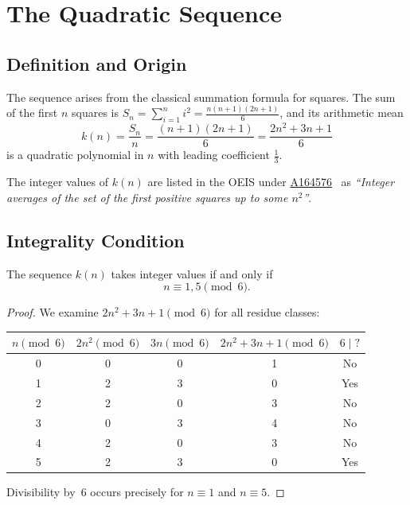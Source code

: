 \section{The Quadratic Sequence}\label{sec:sequence}

\subsection{Definition and Origin}

The sequence arises from the classical summation formula for squares.
The sum of the first $n$ squares is
$S_n = \sum_{i=1}^{n} i^2 = \frac{n(n+1)(2n+1)}{6}$,
and its arithmetic mean
\begin{equation}\label{eq:k-explicit}
  k(n) = \frac{S_n}{n} = \frac{(n+1)(2n+1)}{6}
       = \frac{2n^2 + 3n + 1}{6}
\end{equation}
is a quadratic polynomial in $n$ with leading coefficient $\frac{1}{3}$.

\begin{remark}
The integer values of $k(n)$ are listed in the OEIS under
\href{https://oeis.org/A164576}{A164576}~\cite{OEIS} as
\emph{``Integer averages of the set of the first positive squares up to
some $n^2$''}.
\end{remark}

\subsection{Integrality Condition}

\begin{theorem}\label{thm:congruence}
The sequence $k(n)$ takes integer values if and only if
\begin{equation}\label{eq:cong}
  n \equiv 1, 5 \pmod{6}.
\end{equation}
\end{theorem}

\begin{proof}
We examine $2n^2 + 3n + 1 \pmod{6}$ for all residue classes:

\begin{center}
\begin{tabular}{ccccc}
\toprule
$n \!\pmod{6}$ & $2n^2 \!\pmod{6}$ & $3n \!\pmod{6}$ & $2n^2\!+\!3n\!+\!1 \!\pmod{6}$ & $6 \mid ?$ \\
\midrule
0 & 0 & 0 & 1 & No \\
1 & 2 & 3 & 0 & Yes \\
2 & 2 & 0 & 3 & No \\
3 & 0 & 3 & 4 & No \\
4 & 2 & 0 & 3 & No \\
5 & 2 & 3 & 0 & Yes \\
\bottomrule
\end{tabular}
\end{center}
Divisibility by~$6$ occurs precisely for $n \equiv 1$ and $n \equiv 5$.
\end{proof}

